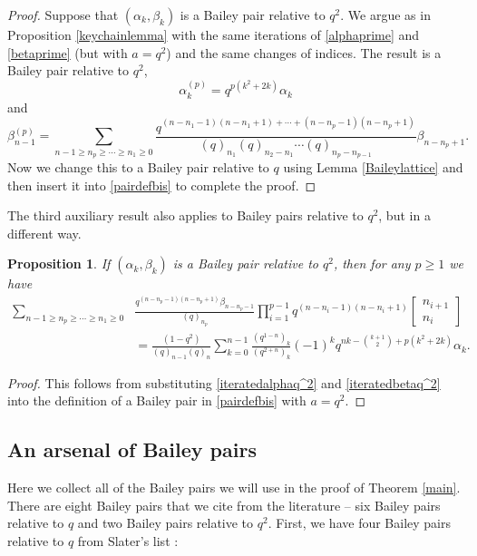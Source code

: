 \documentclass[11pt,reqno]{amsart}
\newtheorem{proposition}[theorem]{Proposition}
\theoremstyle{definition}
\numberwithin{equation}{section}
\renewcommand{\=}{\;=\;}
\begin{document}
\begin{proof}
	Suppose that $(\alpha_k,\beta_k)$ is a Bailey pair relative to $q^2$.   We argue as in Proposition \ref{keychainlemma} with the same iterations of \eqref{alphaprime} and \eqref{betaprime} (but with $a=q^2$) and the same changes of indices.  The result is a Bailey pair relative to $q^2$, 
	\begin{equation} \label{iteratedalphaq^2}
		\alpha_k^{(p)} = q^{p(k^2+2k)}\alpha_k 
	\end{equation}  
	and 
	\begin{equation} \label{iteratedbetaq^2}
		\beta_{n-1}^{(p)} = \sum_{n-1 \geq n_p \geq \cdots \geq n_1\geq 0} \frac{q^{(n - n_1 - 1)(n- n_1 +1) + \cdots + (n-n_p-1)(n-n_p+1)}}{(q)_{n_1} (q)_{n_2-n_1} \cdots (q)_{n_p-n_{p-1}}} \beta_{n -n_p +1}.
	\end{equation}
	Now we change this to a Bailey pair relative to $q$ using Lemma \ref{Baileylattice} and then insert it into \eqref{pairdefbis} to complete the proof.    
\end{proof}

The third auxiliary result also applies to Bailey pairs relative to $q^2$, but in a different way.

\begin{proposition} \label{keychainlemmater}
	If $(\alpha_k,\beta_k)$ is a Bailey pair relative to $q^2$, then for any $p \geq 1$ we have
	\begin{equation} \label{keychainlemmatereq}
		\begin{aligned}
			\sum_{n-1 \geq n_p \geq \cdots \geq n_1\geq 0}& \frac{q^{(n-n_p-1)(n-n_p+1)}\beta_{n-n_p-1}}{(q)_{n_p}} \prod_{i=1}^{p-1} q^{(n-n_i-1)(n-n_i+1)} \begin{bmatrix} n_{i+1} \\ n_i \end{bmatrix} \\
			&= \frac{(1-q^2)}{(q)_{n-1}(q)_{n}} \sum_{k=0}^{n-1} \frac{(q^{1-n})_k}{(q^{2+n})_k}(-1)^k q^{nk -\binom{k+1}{2} + p(k^2+2k)} \alpha_k.
		\end{aligned}
	\end{equation}
\end{proposition}

\begin{proof}
	This follows from substituting \eqref{iteratedalphaq^2} and \eqref{iteratedbetaq^2} into the definition of a Bailey pair in \eqref{pairdefbis} with $a=q^2$.
\end{proof}

\subsection{An arsenal of Bailey pairs} \label{arseBP}
Here we collect all of the Bailey pairs we will use in the proof of Theorem \ref{main}.   There are eight Bailey pairs that we cite from the literature -- six Bailey pairs relative to $q$ and two Bailey pairs relative to $q^2$.   First, we have four Bailey pairs relative to $q$ from Slater's list \cite[p.463, A(2), A(4), A(6), A(8)]{Sl}:
\end{document}
